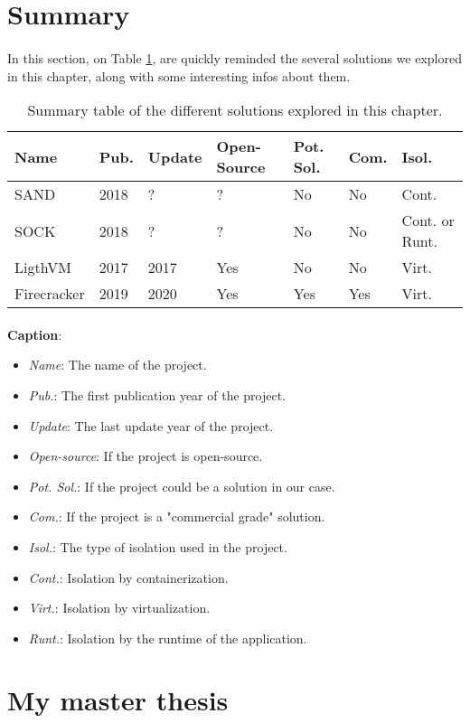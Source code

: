 \section{Summary}
\paragraph{}In this section, on Table \ref{tab:summary}, are quickly reminded the several solutions we explored in this chapter, along with some interesting infos about them.
\begin{table}[!h]

  \begin{center}
    \begin{tabular}{|p{}|p{}|p{}|p{}|p{}|p{}|p{}|}
       \hline
       \textbf{Name} & \textbf{Pub.} & \textbf{Update} & \textbf{Open-Source} & \textbf{Pot. Sol.} & \textbf{Com.} & \textbf{Isol.} \\
       \hline
       SAND & 2018 & ? & ? & No & No & Cont. \\
       \hline
       SOCK & 2018 & ? & ? & No & No & Cont. or Runt. \\
       \hline
       LigthVM & 2017 & 2017 & Yes & No & No & Virt. \\
       \hline
       Firecracker & 2019 & 2020 & Yes & Yes & Yes & Virt.\\
       \hline
    \end{tabular}
  \end{center}
  \caption{Summary table of the different solutions explored in this chapter.}
  \label{tab:summary}
\end{table}
\paragraph{}\textbf{Caption}: 
\begin{itemize}
  \item \textit{Name}: The name of the project.
  \item \textit{Pub.}: The first publication year of the project.
  \item \textit{Update}: The last update year of the project.
  \item \textit{Open-source}: If the project is open-source.
  \item \textit{Pot. Sol.}: If the project could be a solution in our case.
  \item \textit{Com.}: If the project is a "commercial grade" solution.
  \item \textit{Isol.}: The type of isolation used in the project.
  \item \textit{Cont.}: Isolation by containerization.
  \item \textit{Virt.}: Isolation by virtualization.
  \item \textit{Runt.}: Isolation by the runtime of the application.
\end{itemize}

\section{My master thesis}
